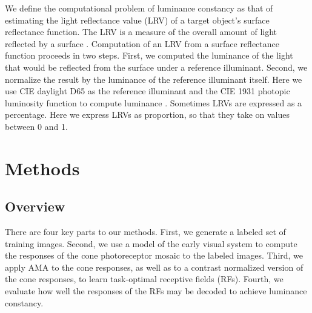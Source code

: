 \documentclass{jov}
\begin{document}
We define the computational problem of luminance constancy as that of estimating the light reflectance value (LRV) of a target object's surface reflectance function.
The LRV is a measure of the overall amount of light reflected by a surface \cite{astm1121477}.
Computation of an LRV from a surface reflectance function proceeds in two steps.
First, we computed the luminance of the light that would be reflected from the surface under a reference illuminant.
Second, we normalize the result by the luminance of the reference illuminant itself.
Here we use CIE daylight D65 as the reference illuminant and the CIE 1931 photopic luminosity function to compute luminance \cite{CIE86}.
Sometimes LRVs are expressed as a percentage.
Here we express LRVs as proportion, so that they take on values between 0 and 1.

\section*{Methods} \label{Methods}
\subsection{Overview}
There are four key parts to our methods.  First, we generate a labeled set of training images.  Second, we use a model of the early visual system to compute the responses of the cone photoreceptor mosaic to the labeled images. Third, we apply AMA to the cone responses, as well as to a contrast normalized version of the cone responses, to learn task-optimal receptive fields (RFs). Fourth, we evaluate how well the responses of the RFs may be decoded to achieve luminance constancy.
\end{document}
